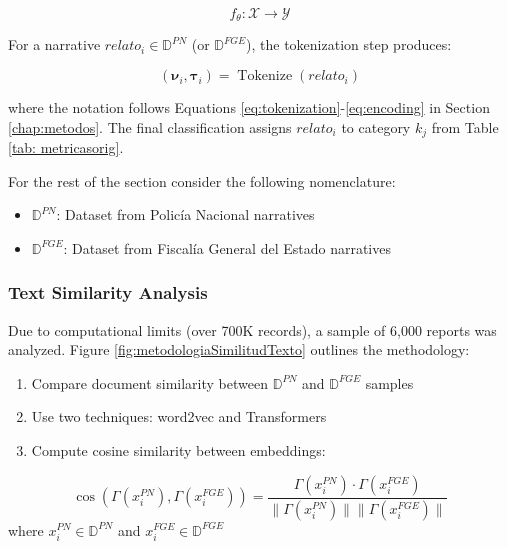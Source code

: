 \documentclass[onecolumn, journal, english, 12pt, a4paper]{IEEEtran} %
\DeclareMathOperator{\Tokenize}{Tokenize}
\theoremstyle{definition}
\begin{document}
\begin{equation}\label{eq:clasificacion}
  f_\theta: \mathbf{\mathcal{X}} \longrightarrow \mathbf{\mathcal{Y}}
\end{equation}

For a narrative $relato_i \in \mathbb{D}^{PN}$ (or
$\mathbb{D}^{FGE}$), the tokenization step produces:

\begin{equation}
(\boldsymbol{\nu}_i, \boldsymbol{\tau}_i) = \Tokenize(relato_i)
\end{equation}

where the notation follows Equations \ref{eq:tokenization}-\ref{eq:encoding} in Section \ref{chap:metodos}. The final classification assigns $relato_i$ to category $k_j$ from Table \ref{tab: metricasorig}.

For the rest of the section consider the following nomenclature:

\begin{itemize}
\item $\mathbb{D}^{PN}$: Dataset from Policía Nacional narratives
\item $\mathbb{D}^{FGE}$: Dataset from Fiscalía General del Estado narratives 
\end{itemize}

\subsubsection{Text Similarity Analysis}
Due to computational limits (over 700K records), a sample of 6,000 reports was analyzed. Figure \ref{fig:metodologiaSimilitudTexto} outlines the methodology:

\begin{enumerate}
    \item Compare document similarity between $\mathbb{D}^{PN}$ and $\mathbb{D}^{FGE}$ samples
    \item Use two techniques: word2vec and Transformers
    \item Compute cosine similarity between embeddings:
\end{enumerate}

\begin{equation}\label{eq:cosinesimilarity}         
        \cos(\Gamma(x_i^{PN}), \Gamma(x_i^{FGE})) = \frac{\Gamma(x_i^{PN})\cdot\Gamma(x_i^{FGE})}{\|\Gamma(x_i^{PN})\|\|\Gamma(x_i^{FGE})\|}
\end{equation}
where $x_i^{PN} \in \mathbb{D}^{PN}$ and $x_i^{FGE} \in \mathbb{D}^{FGE}$
\end{document}
